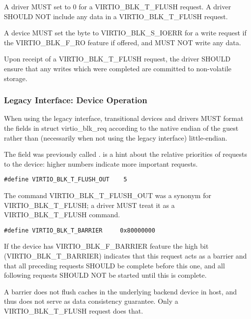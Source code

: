 A driver MUST set  to 0 for a VIRTIO_BLK_T_FLUSH request.
A driver SHOULD NOT include any data in a VIRTIO_BLK_T_FLUSH request.


A device MUST set the  byte to VIRTIO_BLK_S_IOERR
for a write request if the VIRTIO_BLK_F_RO feature if offered, and MUST NOT
write any data.

Upon receipt of a VIRTIO_BLK_T_FLUSH request, the driver SHOULD ensure
that any writes which were completed are committed to non-volatile storage.

\subsubsection{Legacy Interface: Device Operation}\label{sec:Device Types / Block Device / Device Operation / Legacy Interface: Device Operation}
When using the legacy interface, transitional devices and drivers
MUST format the fields in struct virtio_blk_req
according to the native endian of the guest rather than
(necessarily when not using the legacy interface) little-endian.

The  field was previously called .  
is a hint about the relative priorities of requests to the device:
higher numbers indicate more important requests.

\begin{lstlisting}
#define VIRTIO_BLK_T_FLUSH_OUT    5
\end{lstlisting}

The command VIRTIO_BLK_T_FLUSH_OUT was a synonym for VIRTIO_BLK_T_FLUSH;
a driver MUST treat it as a VIRTIO_BLK_T_FLUSH command.

\begin{lstlisting}
#define VIRTIO_BLK_T_BARRIER     0x80000000
\end{lstlisting}

If the device has VIRTIO_BLK_F_BARRIER
feature the high bit (VIRTIO_BLK_T_BARRIER) indicates that this
request acts as a barrier and that all preceding requests SHOULD be
complete before this one, and all following requests SHOULD NOT be
started until this is complete.

\begin{note} A barrier does not flush
caches in the underlying backend device in host, and thus does not
serve as data consistency guarantee.  Only a VIRTIO_BLK_T_FLUSH request
does that.
\end{note}

